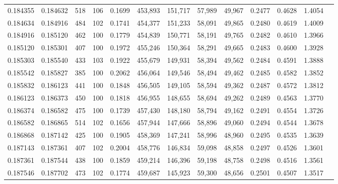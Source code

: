 \begin{tabular}{rrrrrrrrrrrrr}
0.184355 & 0.184632 &   518 & 106 &                                     0.1699 & 453,893 & 151,717 &  57,989 &  49,967 & 0.2477 & 0.4628 & 1.4054 \\
0.184634 & 0.184916 &   484 & 102 &                                     0.1741 & 454,377 & 151,233 &  58,091 &  49,865 & 0.2480 & 0.4619 & 1.4009 \\
0.184916 & 0.185120 &   462 & 100 &                                     0.1779 & 454,839 & 150,771 &  58,191 &  49,765 & 0.2482 & 0.4610 & 1.3966 \\
0.185120 & 0.185301 &   407 & 100 &                                     0.1972 & 455,246 & 150,364 &  58,291 &  49,665 & 0.2483 & 0.4600 & 1.3928 \\
0.185303 & 0.185540 &   433 & 103 &                                     0.1922 & 455,679 & 149,931 &  58,394 &  49,562 & 0.2484 & 0.4591 & 1.3888 \\
0.185542 & 0.185827 &   385 & 100 &                                     0.2062 & 456,064 & 149,546 &  58,494 &  49,462 & 0.2485 & 0.4582 & 1.3852 \\
0.185832 & 0.186123 &   441 & 100 &                                     0.1848 & 456,505 & 149,105 &  58,594 &  49,362 & 0.2487 & 0.4572 & 1.3812 \\
0.186123 & 0.186373 &   450 & 100 &                                     0.1818 & 456,955 & 148,655 &  58,694 &  49,262 & 0.2489 & 0.4563 & 1.3770 \\
0.186374 & 0.186582 &   475 & 100 &                                     0.1739 & 457,430 & 148,180 &  58,794 &  49,162 & 0.2491 & 0.4554 & 1.3726 \\
0.186582 & 0.186865 &   514 & 102 &                                     0.1656 & 457,944 & 147,666 &  58,896 &  49,060 & 0.2494 & 0.4544 & 1.3678 \\
0.186868 & 0.187142 &   425 & 100 &                                     0.1905 & 458,369 & 147,241 &  58,996 &  48,960 & 0.2495 & 0.4535 & 1.3639 \\
0.187143 & 0.187361 &   407 & 102 &                                     0.2004 & 458,776 & 146,834 &  59,098 &  48,858 & 0.2497 & 0.4526 & 1.3601 \\
0.187361 & 0.187544 &   438 & 100 &                                     0.1859 & 459,214 & 146,396 &  59,198 &  48,758 & 0.2498 & 0.4516 & 1.3561 \\
0.187546 & 0.187702 &   473 & 102 &                                     0.1774 & 459,687 & 145,923 &  59,300 &  48,656 & 0.2501 & 0.4507 & 1.3517 \\

\end{tabular}
